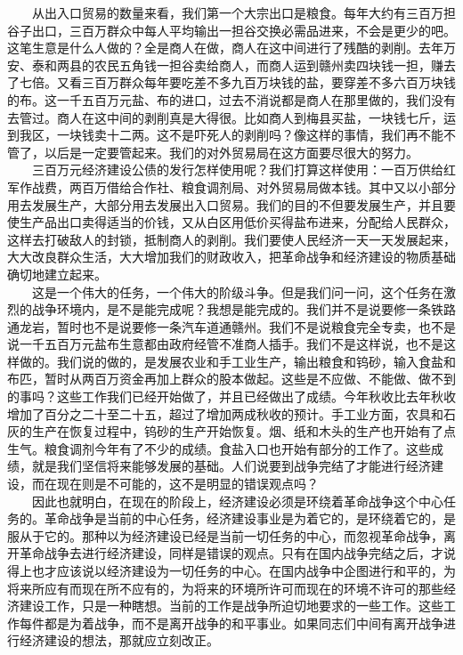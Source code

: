 \documentclass[cn,11pt,chinese]{elegantbook}
\begin{document}
　　从出入口贸易的数量来看，我们第一个大宗出口是粮食。每年大约有三百万担谷子出口，三百万群众中每人平均输出一担谷交换必需品进来，不会是更少的吧。这笔生意是什么人做的？全是商人在做，商人在这中间进行了残酷的剥削。去年万安、泰和两县的农民五角钱一担谷卖给商人，而商人运到赣州卖四块钱一担，赚去了七倍。又看三百万群众每年要吃差不多九百万块钱的盐，要穿差不多六百万块钱的布。这一千五百万元盐、布的进口，过去不消说都是商人在那里做的，我们没有去管过。商人在这中间的剥削真是大得很。比如商人到梅县买盐，一块钱七斤，运到我区，一块钱卖十二两。这不是吓死人的剥削吗？像这样的事情，我们再不能不管了，以后是一定要管起来。我们的对外贸易局在这方面要尽很大的努力。\\
　　三百万元经济建设公债的发行怎样使用呢？我们打算这样使用：一百万供给红军作战费，两百万借给合作社、粮食调剂局、对外贸易局做本钱。其中又以小部分用去发展生产，大部分用去发展出入口贸易。我们的目的不但要发展生产，并且要使生产品出口卖得适当的价钱，又从白区用低价买得盐布进来，分配给人民群众，这样去打破敌人的封锁，抵制商人的剥削。我们要使人民经济一天一天发展起来，大大改良群众生活，大大增加我们的财政收入，把革命战争和经济建设的物质基础确切地建立起来。\\
　　这是一个伟大的任务，一个伟大的阶级斗争。但是我们问一问，这个任务在激烈的战争环境内，是不是能完成呢？我想是能完成的。我们并不是说要修一条铁路通龙岩，暂时也不是说要修一条汽车道通赣州。我们不是说粮食完全专卖，也不是说一千五百万元盐布生意都由政府经管不准商人插手。我们不是这样说，也不是这样做的。我们说的做的，是发展农业和手工业生产，输出粮食和钨砂，输入食盐和布匹，暂时从两百万资金再加上群众的股本做起。这些是不应做、不能做、做不到的事吗？这些工作我们已经开始做了，并且已经做出了成绩。今年秋收比去年秋收增加了百分之二十至二十五，超过了增加两成秋收的预计。手工业方面，农具和石灰的生产在恢复过程中，钨砂的生产开始恢复。烟、纸和木头的生产也开始有了点生气。粮食调剂今年有了不少的成绩。食盐入口也开始有部分的工作了。这些成绩，就是我们坚信将来能够发展的基础。人们说要到战争完结了才能进行经济建设，而在现在则是不可能的，这不是明显的错误观点吗？\\
　　因此也就明白，在现在的阶段上，经济建设必须是环绕着革命战争这个中心任务的。革命战争是当前的中心任务，经济建设事业是为着它的，是环绕着它的，是服从于它的。那种以为经济建设已经是当前一切任务的中心，而忽视革命战争，离开革命战争去进行经济建设，同样是错误的观点。只有在国内战争完结之后，才说得上也才应该说以经济建设为一切任务的中心。在国内战争中企图进行和平的，为将来所应有而现在所不应有的，为将来的环境所许可而现在的环境不许可的那些经济建设工作，只是一种瞎想。当前的工作是战争所迫切地要求的一些工作。这些工作每件都是为着战争，而不是离开战争的和平事业。如果同志们中间有离开战争进行经济建设的想法，那就应立刻改正。\\
\end{document}
